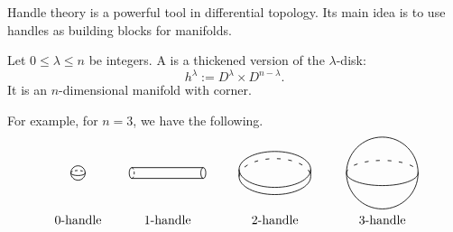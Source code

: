 Handle theory is a powerful tool in differential topology.
Its main idea is to use handles
as building blocks for manifolds.

\begin{definition}
    Let $0\leq\lambda\leq n$ be integers.
    A  is a thickened version of the $\lambda$-disk:
    \[ h^\lambda := D^\lambda \times D^{n-\lambda}. \]
    It is an $n$-dimensional manifold with corner.
\end{definition}

For example, for $n=3$, we have the following.
\[ \begin{tikzpicture}[line width=.6, baseline=(base.base)]
    \tikzstyle{dp}=[dash pattern=on 2pt off 2pt]
    \draw (0,0) circle (.2);
    \draw[dp] (-.2,0) arc (180 : 0 : .2 and .07);
    \draw (-.2,0) arc (180 : 360 : .2 and .07);
    \node at (0,-1.3) {\text{$0$-handle}};
    
    \draw (1.5,.15) arc (90 : 270 : .07 and .15);
    \draw[dp] (1.5,.15) arc (90 : -90 : .07 and .15);
    \draw (3.5,0) ellipse (.07 and .15);
    \draw (1.5,.15) -- (3.5,.15) (1.5,-.15) -- (3.5,-.15);
    \node at (2.5,-1.3) {\text{$1$-handle}};

    \draw (5.5,.1) ellipse (1 and .5);
    \draw[loosely dashed] (4.5,-.1) arc (180 : 0 : 1 and .5);
    \draw (4.5,-.1) arc (180 : 360 : 1 and .5);
    \draw (4.5,.1) -- (4.5,-.1) (6.5,.1) -- (6.5,-.1);
    \node at (5.5,-1.3) {\text{$2$-handle}};

    \draw (8.5,0) circle (1);
    \draw[loosely dashed] (7.5,0) arc (180 : 0 : 1 and .35);
    \draw (7.5,0) arc (180 : 360 : 1 and .35);
    \node (base) at (8.5,-1.3) {\text{$3$-handle}};
\end{tikzpicture} \]

